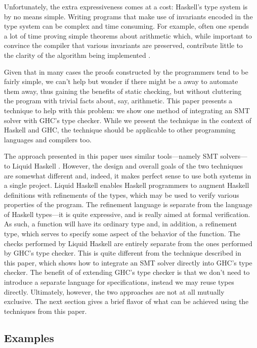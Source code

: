 \documentclass{sigplanconf}
\begin{document}
Unfortunately, the extra expressiveness comes at a cost:
Haskell's type system is by no means simple. Writing
programs that make use of invariants encoded in the
type system can be complex and time consuming.  For
example, often one spends a lot of time proving simple theorems
about arithmetic which, while important to convince the compiler
that various invariants are preserved, contribute little to
the clarity of the algorithm being implemented \cite{Lindley2013}.

Given that in many cases the proofs constructed by the programmers
tend to be fairly simple, we can't help but wonder if there might
be a away to automate them away, thus gaining the benefits of
static checking, but without cluttering the program with trivial
facts about, say, arithmetic.  This paper presents a technique
to help with this problem: we show one method of integrating
an SMT solver with GHC's type checker.  While we present
the technique in the context of Haskell and GHC, the technique
should be applicable to other programming languages and compilers too.

The approach presented in this paper uses similar tools---namely
SMT solvers---to Liquid Haskell \cite{liquid-haskell}. However,
the design and overall goals of the two techniques are somewhat
different and, indeed, it makes perfect sense to use both systems
in a single project.  Liquid Haskell enables Haskell programmers
to augment Haskell definitions with refinements of the types,
which may be used to verify various properties of the program.
The refinement language is separate from the language of Haskell
types---it is quite expressive, and is really aimed at formal
verification.  As such, a function will have its ordinary
type and, in addition, a refinement type, which serves to specify
some aspect of the behavior of the function.  The checks performed
by Liquid Haskell are entirely separate from the ones performed
by GHC's type checker.  This is quite different from the
technique described in this paper, which shows how to integrate
an SMT solver directly into GHC's type checker.  The benefit of
of extending GHC's type checker is that we don't need to
introduce a separate language for specifications, instead
we may reuse types directly.  Ultimately, however, the two
approaches are not at all mutually exclusive.  The next
section gives a brief flavor of what can be achieved using
the techniques from this paper.

\subsection{Examples}
\end{document}
